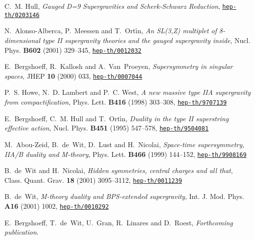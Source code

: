 \documentclass[12pt,a4paper]{article}
\begin{document}
\begin{thebibliography}{10}
C.~M. Hull, \emph{Gauged D=9 Supergravities and Scherk-Schwarz Reduction},
\href{http://arXiv.org/abs/hep-th/0203146}{{\tt hep-th/0203146}}

N.~Alonso-Alberca, P.~Meessen  and T.~Ort\'\i{}n, \emph{An SL(3,Z) multiplet of
  8-dimensional type II supergravity theories and the gauged supergravity
  inside}, Nucl. Phys. {\bf B602} (2001) 329--345,
\href{http://arXiv.org/abs/hep-th/0012032}{{\tt hep-th/0012032}}

E.~Bergshoeff, R.~Kallosh  and A.~Van~Proeyen, \emph{Supersymmetry in singular
  spaces}, JHEP {\bf 10} (2000) 033,
\href{http://arXiv.org/abs/hep-th/0007044}{{\tt hep-th/0007044}}

P.~S. Howe, N.~D. Lambert  and P.~C. West, \emph{A new massive type IIA
  supergravity from compactification}, Phys. Lett. {\bf B416} (1998) 303--308,
\href{http://arXiv.org/abs/hep-th/9707139}{{\tt hep-th/9707139}}

E.~Bergshoeff, C.~M. Hull  and T.~Ort\'\i n, \emph{Duality in the type II
  superstring effective action}, Nucl. Phys. {\bf B451} (1995) 547--578,
\href{http://arXiv.org/abs/hep-th/9504081}{{\tt hep-th/9504081}}

M.~Abou-Zeid, B.~de~Wit, D.~Lust  and H.~Nicolai, \emph{Space-time
  supersymmetry, IIA/B duality and M-theory}, Phys. Lett. {\bf B466} (1999)
  144--152,
\href{http://arXiv.org/abs/hep-th/9908169}{{\tt hep-th/9908169}}

B.~de~Wit and H.~Nicolai, \emph{Hidden symmetries, central charges and all
  that}, Class. Quant. Grav. {\bf 18} (2001) 3095--3112,
\href{http://arXiv.org/abs/hep-th/0011239}{{\tt hep-th/0011239}}

B.~de~Wit, \emph{M-theory duality and BPS-extended supergravity}, Int. J. Mod.
  Phys. {\bf A16} (2001) 1002,
\href{http://arXiv.org/abs/hep-th/0010292}{{\tt hep-th/0010292}}

E.~Bergshoeff, T.~de~Wit, U.~Gran, R.~Linares and D.~Roest, \emph{Forthcoming publication}.

\end{thebibliography}\endgroup
\end{document}
